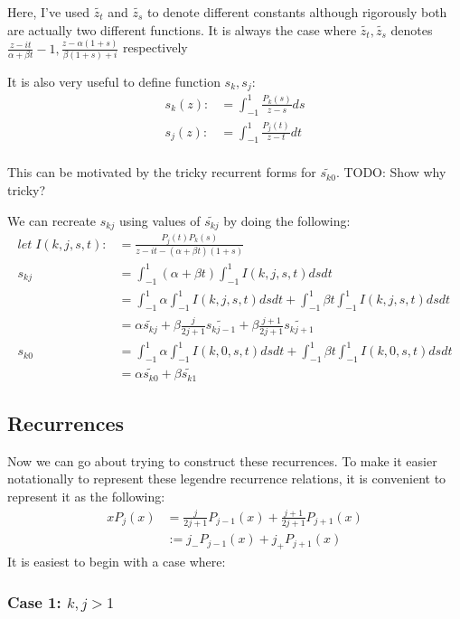 \documentclass{article}
\begin{document}
Here, I've used $\tilde{z_t}$ and $\tilde{z_s}$ to denote different constants although rigorously both are actually two different functions.
It is always the case where $\tilde{z_t}, \tilde{z_s}$ denotes
$\frac{z-it}{\alpha+\beta t}-1,\frac{z-\alpha(1+s)}{\beta(1+s)+i}$ respectively

It is also very useful to define function $s_k, s_j$:
\begin{align}
	s_k(z) :&= \int_{-1}^1\frac{P_k(s)}{z-s}ds \\ 
	s_j(z) :&= \int_{-1}^1\frac{P_j(t)}{z-t}dt \\ 
\end{align}

This can be motivated by the tricky recurrent forms for $\tilde{s_{k0}}$.
TODO: Show why tricky?

We can recreate $s_{kj}$ using values of $\tilde{s_{kj}}$ by doing the following:
\begin{align}
	let\; I(k,j,s,t) :&= \frac{P_j(t)P_k(s)}{z-it-(\alpha+\beta t)(1+s)}\\ 
	s_{kj} &= \int_{-1}^1(\alpha+\beta t)\int_{-1}^1 I(k,j,s,t) dsdt\\
	&= \int_{-1}^1\alpha\int_{-1}^1 I(k,j,s,t)dsdt +
	\int_{-1}^1\beta t\int_{-1}^1 I(k,j,s,t) dsdt\\
	&= \alpha\tilde{s_{kj}} + \beta\frac{j}{2j+1}\tilde{s_{kj-1}} + \beta\frac{j+1}{2j+1}\tilde{s_{kj+1}} \\
	s_{k0} &= \int_{-1}^1\alpha\int_{-1}^1 I(k,0,s,t)dsdt +
	\int_{-1}^1\beta t\int_{-1}^1 I(k,0,s,t) dsdt \\
	&= \alpha\tilde{s_{k0}} + \beta\tilde{s_{k1}}
\end{align}

\subsection{Recurrences}

Now we can go about trying to construct these recurrences.
To make it easier notationally to represent these legendre recurrence relations, it is convenient to represent it as the following:
\begin{align}
    xP_j(x) &= \frac{j}{2j+1}P_{j-1}(x)+\frac{j+1}{2j+1}P_{j+1}(x) \\
    &:= j_-P_{j-1}(x)+j_+P_{j+1}(x)
\end{align}
It is easiest to begin with a case where:

\subsubsection*{Case 1: $k,j>1$}
\end{document}
